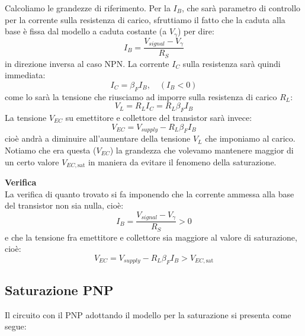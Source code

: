 \documentclass[a4paper,11pt]{article}
\begin{document}
Calcoliamo le grandezze di riferimento. Per la $I_B$, che sarà parametro di controllo per la corrente sulla resistenza di carico, sfruttiamo il fatto che la caduta alla base è fissa dal modello a caduta costante (a $V_\gamma$) per dire:
$$
I_B = \frac{V_{signal} - V_\gamma}{R_S}
$$
in direzione inversa al caso NPN.
La corrente $I_C$ sulla resistenza sarà quindi immediata:
$$
I_C = \beta_F I_B, \quad (I_B < 0)
$$
come lo sarà la tensione che riusciamo ad imporre sulla resistenza di carico $R_L$:
$$
V_L = R_L I_C = R_L \beta_F I_B
$$
La tensione $V_{EC}$ su emettitore e collettore del transistor sarà invece:
$$
V_{EC} = V_{supply} - R_L \beta_F I_B
$$
cioè andrà a diminuire all'aumentare della tensione $V_L$ che imponiamo al carico. Notiamo che era questa ($V_{EC}$) la grandezza che volevamo mantenere maggior di un certo valore $V_{EC,\mathrm{sat}}$ in maniera da evitare il fenomeno della saturazione.

\par\smallskip
\noindent
\textbf{\textsf{Verifica}} \\
\noindent
La verifica di quanto trovato si fa imponendo che la corrente ammessa alla base del transistor non sia nulla, cioè:
$$
I_B = \frac{V_{signal} - V_\gamma}{R_S} > 0
$$
e che la tensione fra emettitore e collettore sia maggiore al valore di saturazione, cioè:
$$
V_{EC} = V_{supply} - R_L \beta_F I_B > V_{EC,\mathrm{sat}}
$$

\subsection{Saturazione PNP}
Il circuito con il PNP adottando il modello per la saturazione si presenta come segue:
\end{document}
